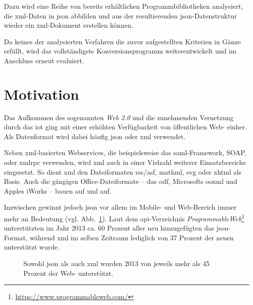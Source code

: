Dazu wird eine Reihe von bereits erhältlichen Programmbibliotheken analysiert,
die \acrshort{xml}-Daten in \acrshort{json} abbilden und aus der resultierenden
\acrshort{json}-Datenstruktur wieder ein \acrshort{xml}-Dokument erstellen können.

Da keines der analysierten Verfahren die zuvor aufgestellten Kriterien
in Gänze erfüllt, wird das vollständigste Konversionsprogramm
weiterentwickelt und im Anschluss erneut evaluiert.

\section{Motivation}
\label{sec:motivation}
Das Aufkommen des sogenannten \emph{Web 2.0} und die zunehmenden Vernetzung
durch das \gls{iot} ging mit einer erhöhten
Verfügbarkeit von öffentlichen Web- einher. Als Datenformat wird dabei
häufig \acrshort{json} oder \acrshort{xml} verwendet.

Neben \acrshort{xml}-basierten Webservices, die beispielsweise das \acrshort{saml}-Framework, SOAP,
oder \gls{xmlrpc} verwenden, wird \acrshort{xml} auch in einer Vielzahl weiterer
Einsatzbereiche eingesetzt. So dient \acrshort{xml} den Dateiformaten \acrshort{rss}/\acrshort{asf}, \acrshort{mathml},
\gls{svg} oder \gls{xhtml} als Basis. Auch die gängigen
Office-Dateiformate -- das \acrfull{odf}, Microsofts %
\acrfull{ooxml} und Apples iWorks -- bauen auf \acrshort{xml} auf. %

Inzwischen gewinnt jedoch \acrshort{json} vor allem im Mobile-
und Web-Bereich immer mehr an Bedeutung (vgl. Abb.~\ref{fig:xmljsonapis}). Laut dem \acrshort{api}-Verzeichnis
\emph{ProgrammableWeb}\footnote{\url{https://www.programmableweb.com/}} unterstützten im Jahr 2013 ca. 60 Prozent aller neu
hinzugefügten  das \acrshort{json}-Format, während
\acrshort{xml} im selben Zeitraum lediglich von 37 Prozent der neuen 
unterstützt wurde.~\cite{duvander2013convergence}

\begin{figure}[h!]
    \begin{center}
        
    \end{center}
    \caption{Sowohl \acrshort{json} als auch \acrshort{xml} wurden 2013 von jeweils mehr als 45 Prozent der Web- unterstützt.}
    \label{fig:xmljsonapis}
\end{figure}


